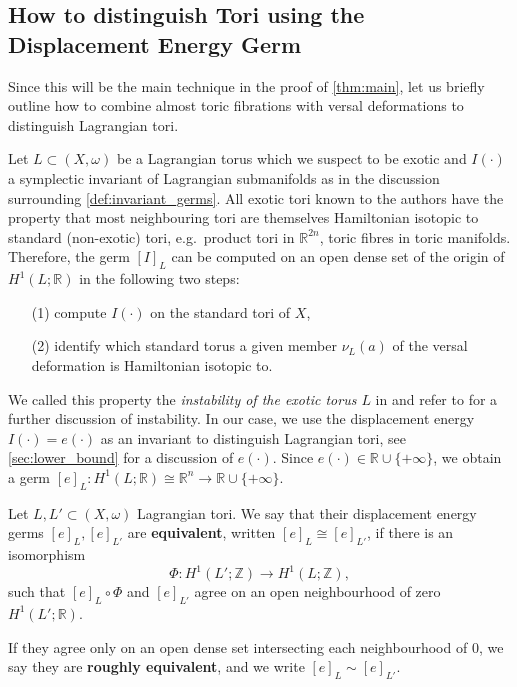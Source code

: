 \documentclass[12pt,a4paper,draft]{scrartcl}
\begin{document}
\subsection{How to distinguish Tori using the Displacement Energy Germ}
\label{sec:howto_exotic}

Since this will be the main technique in the proof of \cref{thm:main}, let us briefly outline how to combine almost toric fibrations with versal deformations to distinguish Lagrangian tori. 

Let $L \subset (X,\omega)$ be a Lagrangian torus which we suspect to be exotic and $I(\cdot)$ a symplectic invariant of Lagrangian submanifolds as in the discussion surrounding \cref{def:invariant_germs}.
All exotic tori known to the authors have the property that most neighbouring tori are themselves Hamiltonian isotopic to standard (non-exotic) tori, e.g.\ product tori in $\mathbb{R}^{2n}$, toric fibres in toric manifolds.
Therefore, the germ $[I]_L$ can be computed on an open dense set of the origin of $H^1(L;\mathbb{R})$ in the following two steps: 
\begin{enumerate}
    \item[(1)] compute $I(\cdot)$ on the standard tori of $X$, 
    \item[(2)] identify which standard torus a given member $\nu_L(a)$ of the versal deformation is Hamiltonian isotopic to. 
\end{enumerate}
We called this property the \textit{instability of the exotic torus $L$} in \cite{brendel2023local} and refer to \cite[Sections 1.6, 5.1]{brendel2023local} for a further discussion of instability.
In our case, we use the displacement energy $I(\cdot) = e(\cdot)$ as an invariant to distinguish Lagrangian tori, see \cref{sec:lower_bound} for a discussion of $e(\cdot)$.
Since $e(\cdot) \in \mathbb{R} \cup \{+\infty\}$, we obtain a germ $[e]_L \colon H^1(L;\mathbb{R}) \cong \mathbb{R}^n \rightarrow \mathbb{R} \cup \{+\infty\}$. 

\begin{definition}
    \label{def:deg_equiv}
    Let $L,L' \subset (X,\omega)$ Lagrangian tori.
We say that their displacement energy germs $[e]_L,[e]_{L'}$ are \textbf{equivalent}, written $[e]_L \cong [e]_{L'}$, if there is an isomorphism 
    \begin{equation}
        \label{eq:phi_isomorphism}
        \Phi \colon H^1(L';\mathbb{Z}) \rightarrow H^1(L;\mathbb{Z}),
    \end{equation}
    such that $[e]_L \circ \Phi$ and $[e]_{L'}$ agree on an open neighbourhood of zero $H^1(L';\mathbb{R})$.
    
    If they agree only on an open dense set intersecting each neighbourhood of $0$, we say they are \textbf{roughly equivalent}, and we write $[e]_L \sim [e]_{L'}$.
\end{definition}
\end{document}
